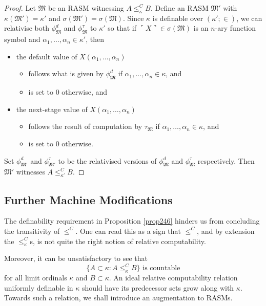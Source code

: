 \documentclass[12pt]{article}
\numberwithin{equation}{section}
\begin{document}
\begin{proof}
Let $\mathfrak{M}$ be an RASM witnessing $A \leq^C_{\kappa} B$. Define an RASM $\mathfrak{M}'$ with $\kappa(\mathfrak{M}') = \kappa'$ and $\sigma(\mathfrak{M}') = \sigma(\mathfrak{M})$. Since $\kappa$ is definable over $(\kappa'; \in)$, we can relativise both $\phi^d_{\mathfrak{M}}$ and $\phi^{\tau}_{\mathfrak{M}}$ to $\kappa'$ so that if $\ulcorner X \urcorner \in \sigma(\mathfrak{M})$ is an $n$-ary function symbol and $\alpha_1, \dots, \alpha_n \in \kappa'$, then 
\begin{itemize}
    \item the default value of $X(\alpha_1, \dots, \alpha_n)$
    \begin{itemize}[label=$\circ$]
        \item follows what is given by $\phi^d_{\mathfrak{M}}$ if $\alpha_1, \dots, \alpha_n \in \kappa$, and
        \item is set to $0$ otherwise, and
    \end{itemize}
    \item the next-stage value of $X(\alpha_1, \dots, \alpha_n)$
    \begin{itemize}[label=$\circ$]
        \item follows the result of computation by $\tau_{\mathfrak{M}}$ if $\alpha_1, \dots, \alpha_n \in \kappa$, and
        \item is set to $0$ otherwise.
    \end{itemize}
\end{itemize} 
Set $\phi^d_{\mathfrak{M}'}$ and $\phi^{\tau}_{\mathfrak{M}'}$ to be the relativised versions of $\phi^d_{\mathfrak{M}}$ and $\phi^{\tau}_{\mathfrak{M}}$ respectively. Then $\mathfrak{M}'$ witnesses $A \leq^C_{\kappa'} B$.
\end{proof}

\subsection{Further Machine Modifications}

The definability requirement in Proposition \ref{prop246} hinders us from concluding the transitivity of $\leq^C$. One can read this as a sign that $\leq^C$, and by extension the $\leq^C_{\kappa}$s, is not quite the right notion of relative computability.

Moreover, it can be unsatisfactory to see that
\begin{equation*}
    \{A \subset \kappa : A \leq^C_{\kappa} B\} \text{ is countable}
\end{equation*}
for all limit ordinals $\kappa$ and $B \subset \kappa$. An ideal relative computability relation uniformly definable in $\kappa$ should have its predecessor sets grow along with $\kappa$. Towards such a relation, we shall introduce an augmentation to RASMs.
\end{document}
